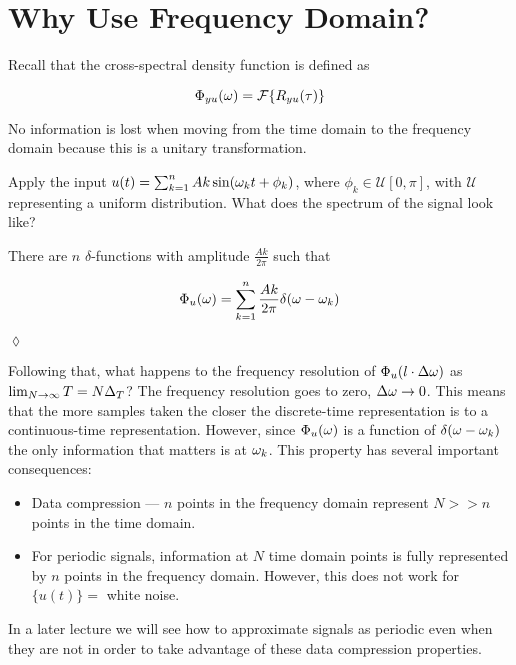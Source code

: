 \mainmatter%
\setcounter{page}{1}

\lectureseries[\course]{\course}

\date{October 13, 2009}

\setaddress%

\setcounter{lecture}{5}
\setcounter{chapter}{5}


\section{Why Use Frequency Domain?}
Recall that the cross-spectral density function is defined as

\begin{equation*}
\Phi_{yu}(\omega) = \mathcal{F}\{R_{yu}(\tau)\}
\end{equation*}

No information is lost when moving from the time domain to the frequency domain because this is a unitary transformation.

\begin{example}
Apply the input $u(t) = \sum_{k=1}^n Ak\sin(\omega_k t+\phi_k)$, where $\phi_k\in\mathcal{U}[0,\pi]$, with $\mathcal{U}$ representing a uniform distribution.
What does the spectrum of the signal look like?

There are $n$ $\delta$-functions with amplitude $\frac{Ak}{2\pi}$ such that

\begin{equation*}
\Phi_u(\omega) = \sum_{k=1}^n \frac{Ak}{2\pi}\delta(\omega-\omega_k)
\end{equation*}

 $\lozenge$
\end{example}

Following that, what happens to the frequency resolution of $\Phi_u(l\cdot\Delta\omega)$ as $\lim_{N\to\infty}T = N\Delta_T$? The frequency resolution goes to zero, $\Delta\omega\to 0$.
This means that the more samples taken the closer the discrete-time representation is to a continuous-time representation.
However, since $\Phi_u(\omega)$ is a function of $\delta(\omega-\omega_k)$ the only information that matters is at $\omega_k$.
This property has several important consequences:
\begin{itemize}
\item Data compression --- $n$ points in the frequency domain represent $N>>n$ points in the time domain.
\item For periodic signals, information at $N$ time domain points is fully represented by $n$ points in the frequency domain.
However, this does not work for $\{u(t)\} =$ white noise.
\end{itemize}
In a later lecture we will see how to approximate signals as periodic even when they are not in order to take advantage of these data compression properties.


